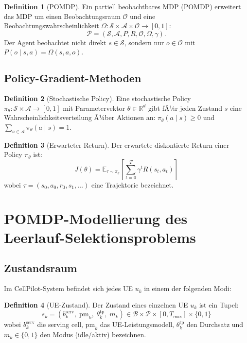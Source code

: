 ﻿\documentclass[a4paper,12pt]{article}
\theoremstyle{definition}
\newtheorem{definition}{Definition}
\begin{document}
\begin{definition}[POMDP]
  Ein partiell beobachtbares MDP (POMDP) erweitert das MDP um einen
  Beobachtungsraum $\mathcal{O}$ und eine Beobachtungswahrscheinlichkeit
  $\Omega: \mathcal{S} \times \mathcal{A} \times \mathcal{O} \to [0,1]$:
  \[
    \mathcal{P} = (\mathcal{S}, \mathcal{A}, P, R, \mathcal{O}, \Omega, \gamma).
  \]
  Der Agent beobachtet nicht direkt $s \in \mathcal{S}$, sondern nur
  $o \in \mathcal{O}$ mit $P(o \mid s, a) = \Omega(s, a, o)$.
\end{definition}

\subsection{Policy-Gradient-Methoden}

\begin{definition}[Stochastische Policy]
  Eine stochastische Policy $\pi_\theta: \mathcal{S} \times \mathcal{A} \to [0,1]$
  mit Parametervektor $\theta \in \mathbb{R}^d$ gibt fÃ¼r jeden Zustand $s$
  eine Wahrscheinlichkeitsverteilung Ã¼ber Aktionen an:
  $\pi_\theta(a \mid s) \geq 0$ und $\sum_{a \in \mathcal{A}} \pi_\theta(a \mid s) = 1$.
\end{definition}

\begin{definition}[Erwarteter Return]
  Der erwartete diskontierte Return einer Policy $\pi_\theta$ ist:
  \[
    J(\theta) = \mathbb{E}_{\tau \sim \pi_\theta}\!\left[\sum_{t=0}^{T} \gamma^t R(s_t, a_t)\right]
  \]
  wobei $\tau = (s_0, a_0, r_0, s_1, \ldots)$ eine Trajektorie bezeichnet.
\end{definition}

\section{POMDP-Modellierung des Leerlauf-Selektionsproblems}
\label{sec:pomdp}

\subsection{Zustandsraum}

Im CellPilot-System befindet sich jedes UE $u_k$ in einem der folgenden Modi:

\begin{definition}[UE-Zustand]
  Der Zustand eines einzelnen UE $u_k$ ist ein Tupel:
  \[
    s_k = (b_k^{\mathrm{serv}},\; \mathrm{pm}_k,\; \theta_k^{\mathrm{tp}},\; m_k)
    \in \mathcal{B} \times \mathcal{P} \times [0, T_{\max}] \times \{0,1\}
  \]
  wobei $b_k^{\mathrm{serv}}$ die serving cell, $\mathrm{pm}_k$ das UE-Leistungsmodell,
  $\theta_k^{\mathrm{tp}}$ den Durchsatz und $m_k \in \{0,1\}$ den Modus (idle/aktiv) bezeichnen.
\end{definition}
\end{document}

